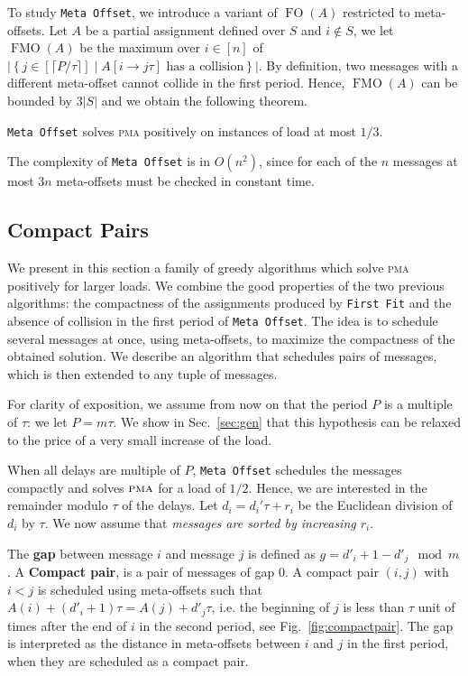 \documentclass[a4paper,UKenglish,cleveref, autoref, thm-restate]{lipics-v2019}
\DeclareMathOperator{\Fo}{FO}
\DeclareMathOperator{\Fmo}{FMO}
\newcommand\pma{\textsc{pma}\xspace}
\newcommand\firstfit{\texttt{First Fit}\xspace}
\newcommand\metaoffset{\texttt{Meta Offset}\xspace}
\begin{document}
To study \metaoffset, we introduce a variant of $\Fo(A)$ restricted to meta-offsets.
 Let $A$ be a partial assignment defined over $S$ and $i\notin S$, we let $\Fmo(A)$ be the maximum over $i \in [n]$ of $|\left\{ j \in [\lceil P / \tau \rceil] \mid A[i \rightarrow j\tau] \text{ has a collision}\right\}|$.
 By definition, two messages with a different meta-offset cannot collide in the first period. Hence, $\Fmo(A)$ can be bounded by $3|S|$ and we obtain the following theorem.


\begin{theorem}\label{th:metaoffset}
\metaoffset solves \pma positively on instances of load at most $1/3$.
\end{theorem}

The complexity of \metaoffset is in $O(n^2)$, since for each of the $n$ messages at most $3n$ meta-offsets must be checked in constant time. 

\subsection{Compact Pairs}

We present in this section a family of greedy algorithms which solve \pma positively for larger loads. We combine the good properties of the two previous algorithms: the compactness of the assignments produced by \firstfit and the absence of collision in the first period of \metaoffset. The idea is to schedule several messages at once, using meta-offsets, to maximize the compactness of the obtained solution. We describe an algorithm that schedules pairs of messages, which is then extended to any tuple of messages. 

For clarity of exposition, we assume from now on that the period $P$ is a multiple of $\tau$: we let $P = m\tau$. We show in Sec.~\ref{sec:gen} that this hypothesis can be relaxed to the price of a very small increase of the load. 


When all delays are multiple of $P$, \metaoffset schedules the messages compactly and solves $\pma$ for a load of $1/2$. Hence, we are interested in the remainder modulo $\tau$ of the delays. Let $d_i = d_{i}'\tau + r_i$ be the Euclidean division of $d_i$ by $\tau$. We now assume that \emph{messages are sorted by increasing $r_i$}.

The \textbf{gap} between message $i$ and message $j$ is defined as $g = d'_{i} + 1 - d'_{j} \mod m$.
A \textbf{Compact pair}, is a pair of messages of gap $0$. A compact pair $(i,j)$ with $i < j$ is scheduled using meta-offsets such that $A(i) + (d'_i+1)\tau = A(j) + d'_j\tau$, i.e. the beginning of $j$ is less than $\tau$ unit of times after the end of $i$ in the second period, see Fig.~\ref{fig:compactpair}. The gap is interpreted as the distance in meta-offsets between $i$ and $j$ in the first period, when they are scheduled as a compact pair.
\end{document}

